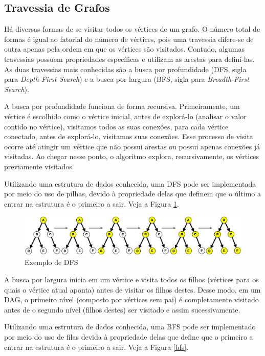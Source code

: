     \subsection[Travessia de Grafos]{Travessia de Grafos}

      Há diversas formas de se visitar todos os vértices de um grafo. O número total de formas é igual ao fatorial do número de vértices, pois uma travessia difere-se de outra apenas pela ordem em que os vértices são visitados. Contudo, algumas travessias possuem propriedades específicas e utilizam as arestas para definí-las. As duas travessias mais conhecidas são a busca por profundidade (DFS, sigla para \textit{Depth-First Search}) e a busca por largura (BFS, sigla para \textit{Breadth-First Search}).

      A busca por profundidade funciona de forma recursiva. Primeiramente, um vértice é escolhido como o vértice inicial, antes de explorá-lo (analisar o valor contido no vértice), visitamos todos as suas conexões, para cada vértice conectado, antes de explorá-lo, visitamos suas conexões. Esse processo de visita ocorre até atingir um vértice que não possui arestas ou possui apenas conexões já visitadas. Ao chegar nesse ponto, o algoritmo explora, recursivamente, os vértices previamente visitados.

      Utilizando uma estrutura de dados conhecida, uma DFS pode ser implementada por meio do uso de pilhas, devido à propriedade delas que definem que o último a entrar na estrutura é o primeiro a sair. Veja a Figura \ref{dfs}.

      \begin{figure}[htb]
        \centering
        \includegraphics[scale=0.2]{figuras/dfs.eps}
        \caption{Exemplo de DFS}
        \label{dfs}
      \end{figure}


      A busca por largura inicia em um vértice e visita todos os filhos (vértices para os quais o vértice atual aponta) antes de visitar os filhos destes. Desse modo, em um DAG, o primeiro nível (composto por vértices sem pai) é completamente visitado antes de o segundo nível (filhos destes) ser visitado e assim sucessivamente.

      Utilizando uma estrutura de dados conhecida, uma BFS pode ser implementado por meio do uso de filas devida à propriedade delas que define que o primeiro a entrar na estrutura é o primeiro a sair. Veja a Figura \ref{bfs}.

